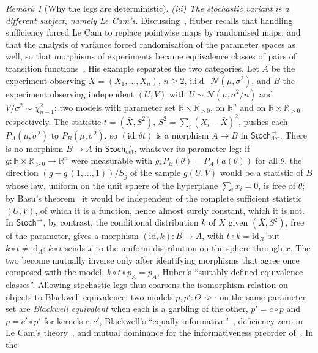 \documentclass[11pt,a4paper]{article}
\theoremstyle{plain}
\theoremstyle{definition}
\theoremstyle{remark}
\newtheorem{remark}[theorem]{Remark}
\newcommand{\cat}[1]{\mathsf{#1}}
\newcommand{\Stoch}{\cat{Stoch}}
\newcommand{\id}{\mathrm{id}}
\newcommand{\del}{\delta}
\newcommand{\R}{\mathbb{R}}
\newcommand{\Norm}{\mathcal{N}}
\newcommand{\Arrdet}[1]{#1^{\rightarrow}_{\det}}
\begin{document}
\begin{remark}[Why the legs are deterministic]
\emph{(iii) The stochastic variant is a different subject, namely Le Cam's.}
Discussing~\cite{mccullagh_what_2002}, Huber recalls that handling sufficiency
forced Le Cam to replace pointwise maps by randomised maps, and that the
analysis of variance forced randomisation of the parameter spaces as well, so
that morphisms of experiments became equivalence classes of pairs of
transition functions~\cite{huber_discussion_2002}. His example separates the
two categories. Let $A$ be the experiment observing
$X = (X_1,\dots,X_n)$, $n \ge 2$, i.i.d.\ $\Norm(\mu,\sigma^{2})$, and $B$
the experiment observing independent $(U,V)$ with
$U \sim \Norm(\mu,\sigma^{2}/n)$ and $V/\sigma^{2} \sim \chi^{2}_{n-1}$: two
models with parameter set $\R \times \R_{>0}$, on $\R^{n}$ and on
$\R \times \R_{>0}$ respectively. The statistic $t = (\bar X, S^{2})$,
$S^{2} = \sum_i (X_i - \bar X)^{2}$, pushes each $P_A(\mu,\sigma^{2})$ to
$P_B(\mu,\sigma^{2})$, so $(\id, \del t)$ is a morphism $A \to B$ in
$\Arrdet{\Stoch}$. There is no morphism $B \to A$ in $\Arrdet{\Stoch}$,
whatever its parameter leg: if $g \colon \R \times \R_{>0} \to \R^{n}$ were
measurable with $g_{*}P_B(\theta) = P_A(a(\theta))$ for all $\theta$, the
direction $(g - \bar g\,(1,\dots,1))/S_g$ of the sample $g(U,V)$ would be
a statistic of $B$ whose law, uniform on the unit sphere of the hyperplane
$\sum_i x_i = 0$, is free of $\theta$; by Basu's
theorem~\cite{basu_statistics_1955} it would be independent of the complete
sufficient statistic $(U,V)$, of which it is a function, hence almost surely
constant, which it is not. In $\Stoch^{\rightarrow}$, by contrast, the
conditional distribution $k$ of $X$ given $(\bar X, S^{2})$, free of the
parameter, gives a morphism $(\id, k) \colon B \to A$, with
$t \circ k = \id_B$ but $k \circ t \neq \id_A$: $k \circ t$ sends
$x$ to the uniform distribution on the sphere through $x$. The two become
mutually inverse only after identifying morphisms that agree once composed
with the model, $k \circ t \circ p_A = p_A$, Huber's ``suitably defined
equivalence classes''. Allowing stochastic legs
thus coarsens the isomorphism relation on objects to Blackwell equivalence:
two models $p, p' \colon \Theta \rightsquigarrow \cdot$ on the same parameter
set are \emph{Blackwell equivalent} when each is a garbling of the other,
$p' = c \circ p$ and $p = c' \circ p'$ for kernels $c, c'$, Blackwell's
``equally informative''~\cite{blackwell_equivalent_1953}, deficiency zero in
Le Cam's theory~\cite{lecam_sufficiency_1964}, and mutual dominance for the
informativeness preorder of~\cite[\S5.1]{fritz_representable_2023}. In the

\end{remark}
\end{document}
